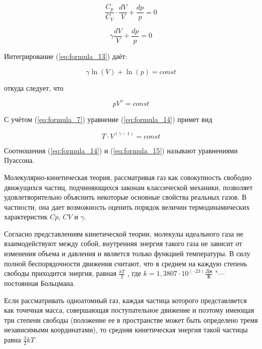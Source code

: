 \begin{equation*}
    \frac{C_p}{C_V} \cdot \frac{d V}{V} + \frac{d p}{p} = 0
\end{equation*}

\begin{equation}
    \gamma \frac{d V}{V} + \frac{d p}{p} = 0
    \label{eq:formula_13}
\end{equation}

Интегрирование (\ref{eq:formula_13}) даёт:

\begin{equation*}
    \gamma \ln(V) + \ln(p) = const
\end{equation*}

откуда следует, что

\begin{equation}
    p V^ \gamma = const
    \label{eq:formula_14}
\end{equation}

С учётом (\ref{eq:formula_7}) уравнение (\ref{eq:formula_14}) примет вид

\begin{equation}
    T \cdot V^(\gamma - 1) = const
    \label{eq:formula_15}
\end{equation}

Соотношения (\ref{eq:formula_14}) и (\ref{eq:formula_15}) называют уравнениями Пуассона.

Молекулярно-кинетическая теория, рассматривая газ как совокупность свободно движущихся частиц, подчиняющихся законам классической механики, позволяет удовлетворительно объяснить некоторые основные свойства реальных газов. В частности, она дает возможность оценить порядок величин термодинамических характеристик $Cp$, $CV$ и $\gamma$.

Согласно представлениям кинетической теории, молекулы идеального газа не взаимодействуют между собой, внутренняя энергия такого газа не зависит от изменения объема и давления и является только функцией температуры. В силу полной беспорядочности движения считают, что в среднем на каждую степень свободы приходится энергия, равная $\frac{kT}{2}$ , где $k = 1,3807 \cdot 10^(–23) \frac{\text{Дж}}{\text{К}}$ "--- постоянная Больцмана.

Если рассматривать одноатомный газ, каждая частица которого представляется как точечная масса, совершающая поступательное движение и поэтому имеющая три степени свободы (положение ее в пространстве может быть определено тремя независимыми координатами), то средняя кинетическая энергия такой частицы равна $\frac{3}{2}kT$

